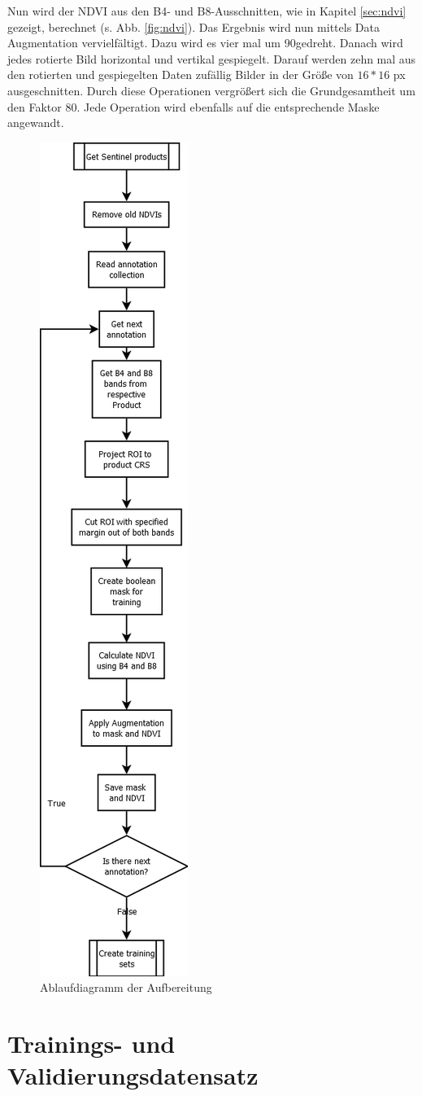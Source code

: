 \noindent
Nun wird der NDVI aus den B4- und B8-Ausschnitten, wie in Kapitel \ref{sec:ndvi} gezeigt, berechnet (s. Abb. \ref{fig:ndvi}). Das Ergebnis wird nun mittels Data Augmentation vervielfältigt. Dazu wird es vier mal um 90\degree gedreht. Danach wird jedes rotierte Bild horizontal und vertikal gespiegelt. Darauf werden zehn mal aus den rotierten und gespiegelten Daten zufällig Bilder in der Größe von $16*16$ px ausgeschnitten. Durch diese Operationen vergrößert sich die Grundgesamtheit um den Faktor 80. Jede Operation wird ebenfalls auf die entsprechende Maske angewandt.

\begin{figure}[ht]
  \centering
  \includegraphics[height=0.95\textheight]{pics/create-ndvi.png}
  \caption{Ablaufdiagramm der Aufbereitung}
  \label{fig:create-ndvi}
\end{figure}

\section{Trainings- und Validierungsdatensatz}